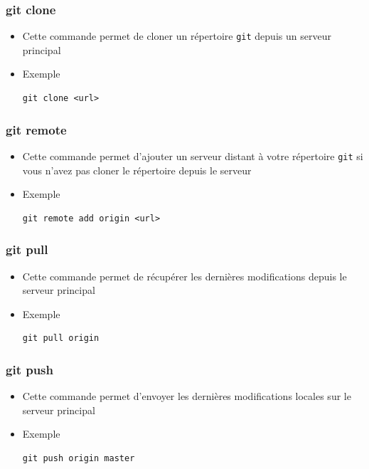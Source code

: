 \documentclass{beamer}
\begin{document}
\begin{frame}[fragile]
\frametitle{git clone}

\begin{itemize}
\item Cette commande permet de cloner un répertoire \texttt{git} depuis un serveur principal
\item Exemple
\begin{lstlisting}
git clone <url>
\end{lstlisting}
\end{itemize}
\end{frame}

\begin{frame}[fragile]
\frametitle{git remote}

\begin{itemize}
\item Cette commande permet d'ajouter un serveur distant à votre répertoire \texttt{git} si vous n'avez pas cloner le répertoire depuis le serveur
\item Exemple
\begin{lstlisting}
git remote add origin <url>
\end{lstlisting}
\end{itemize}
\end{frame}


\begin{frame}[fragile]
\frametitle{git pull}

\begin{itemize}
\item Cette commande permet de récupérer les dernières modifications depuis le serveur principal
\item Exemple
\begin{lstlisting}
git pull origin
\end{lstlisting}
\end{itemize}
\end{frame}

\begin{frame}[fragile]
\frametitle{git push}

\begin{itemize}
\item Cette commande permet d'envoyer les dernières modifications locales sur le serveur principal
\item Exemple
\begin{lstlisting}
git push origin master
\end{lstlisting}
\end{itemize}
\end{frame}
\end{document}
